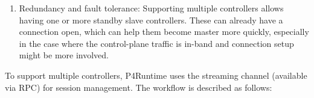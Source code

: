 \documentclass[11pt]{article}
\begin{document}
{\begin{enumerate}
\item{}
Redundancy and fault tolerance: Supporting multiple controllers allows having
one or more standby slave controllers. These can already have a connection
open, which can help them become master more quickly, especially in the case
where the control-plane traffic is in-band and connection setup might be more
involved.%
\end{enumerate}%

\noindent{}To support multiple controllers, P4Runtime uses the streaming channel (available
via  RPC) for session management. The workflow is described as
follows:%

\begin{itemize}%


\end{itemize}}
\end{document}
